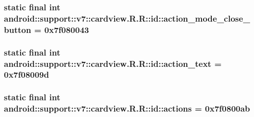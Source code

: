 \hypertarget{classandroid_1_1support_1_1v7_1_1cardview_1_1_r_1_1id_1a1b69dd35df6252bdc2848c77667c27}{
\subsubsection[{action\_\-mode\_\-close\_\-button}]{\setlength{\rightskip}{0pt plus 5cm}static final int android::support::v7::cardview.R.R::id::action\_\-mode\_\-close\_\-button = 0x7f080043}}
\label{classandroid_1_1support_1_1v7_1_1cardview_1_1_r_1_1id_1a1b69dd35df6252bdc2848c77667c27}


\hypertarget{classandroid_1_1support_1_1v7_1_1cardview_1_1_r_1_1id_5b432e7ba0d5aeeae818ea37c72f971d}{
\subsubsection[{action\_\-text}]{\setlength{\rightskip}{0pt plus 5cm}static final int android::support::v7::cardview.R.R::id::action\_\-text = 0x7f08009d}}
\label{classandroid_1_1support_1_1v7_1_1cardview_1_1_r_1_1id_5b432e7ba0d5aeeae818ea37c72f971d}


\hypertarget{classandroid_1_1support_1_1v7_1_1cardview_1_1_r_1_1id_af58ae3d436cae43fd885b62440c532d}{
\subsubsection[{actions}]{\setlength{\rightskip}{0pt plus 5cm}static final int android::support::v7::cardview.R.R::id::actions = 0x7f0800ab}}
\label{classandroid_1_1support_1_1v7_1_1cardview_1_1_r_1_1id_af58ae3d436cae43fd885b62440c532d}


